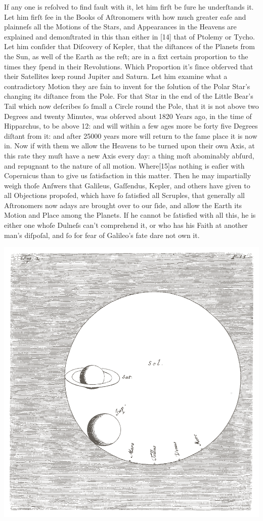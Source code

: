 \documentclass[letterpaper]{book}
\begin{document}
If any one is reſolved to find fault with it, let him firſt be ſure he
underſtands it. Let him firſt ſee in the Books of Aſtronomers with how much
greater eaſe and plainneſs all the Motions of the Stars, and Appearances in
the Heavens are explained and demonſtrated in this than either in [14] that
of Ptolemy or Tycho. Let him conſider that Diſcovery of Kepler, that the
diſtances of the Planets from the Sun, as well of the Earth as the reſt; are
in a fixt certain proportion to the times they ſpend in their Revolutions.
Which Proportion it's ſince obſerved that their Satellites keep round
Jupiter and Saturn. Let him examine what a contradictory Motion they are
fain to invent for the ſolution of the Polar Star's changing its diſtance
from the Pole. For that Star in the end of the Little Bear's Tail which now
deſcribes ſo ſmall a Circle round the Pole, that it is not above two Degrees
and twenty Minutes, was obſerved about 1820 Years ago, in the time of
Hipparchus, to be above 12: and will within a few ages more be forty five
Degrees diſtant from it: and after 25000 years more will return to the ſame
place it is now in. Now if with them we allow the Heavens to be turned upon
their own Axis, at this rate they muſt have a new Axis every day: a thing
moſt abominably abſurd, and repugnant to the nature of all motion.
Where[15]as nothing is eaſier with Copernicus than to give us ſatisfaction
in this matter. Then he may impartially weigh thoſe Anſwers that Galileus,
Gaſſendus, Kepler, and others have given to all Objections propoſed, which
have ſo ſatisfied all Scruples, that generally all Aſtronomers now adays are
brought over to our ſide, and allow the Earth its Motion and Place among the
Planets. If he cannot be ſatisfied with all this, he is either one whoſe
Dulneſs can't comprehend it, or who has his Faith at another man's diſpoſal,
and ſo for fear of Galileo's fate dare not own it.

\begin{center}
	\includegraphics[width=.90 \textwidth]{ct_2_en.jpg}
\end{center}
\end{document}
